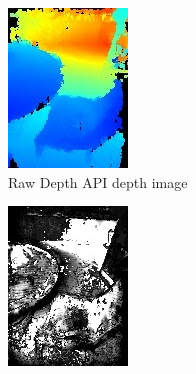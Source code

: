 \begin{figure}[ht!]
    \vspace{0.5em}

    \begin{subfigure}[b]{0.4\textwidth}
        \centering
        \includegraphics[width=0.8\linewidth]{images/depth_raw-depth-image}
        \caption{Raw Depth API depth image}
    \end{subfigure}%
    \begin{subfigure}[b]{0.4\textwidth}
        \centering
        \includegraphics[width=0.8\linewidth]{images/depth_raw-depth-confidence-image}

\end{subfigure}
\end{figure}
